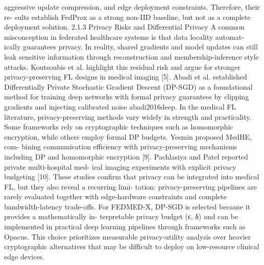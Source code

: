 aggressive update compression, and edge deployment constraints. Therefore, their re- sults establish FedProx as a strong non-IID baseline, but not as a complete deployment solution.
2.1.3
Privacy Risks and Differential Privacy
A common misconception in federated healthcare systems is that data locality automat- ically guarantees privacy. In reality, shared gradients and model updates can still leak sensitive information through reconstruction and membership-inference style attacks.
Koutsoubis et al. highlight this residual risk and argue for stronger privacy-preserving
FL designs in medical imaging [5].
Abadi et al.
established Differentially Private
Stochastic Gradient Descent (DP-SGD) as a foundational method for training deep networks with formal privacy guarantees by clipping gradients and injecting calibrated noise abadi2016deep.
In the medical FL literature, privacy-preserving methods vary widely in strength and practicality. Some frameworks rely on cryptographic techniques such as homomorphic encryption, while others employ formal DP budgets. Yesmin proposed MedHE, com- bining communication efficiency with privacy-preserving mechanisms including DP and homomorphic encryption [9]. Pachlasiya and Patel reported private multi-hospital med- ical imaging experiments with explicit privacy budgeting [10]. These studies confirm that privacy can be integrated into medical FL, but they also reveal a recurring limi- tation: privacy-preserving pipelines are rarely evaluated together with edge-hardware constraints and complete bandwidth-latency trade-offs.
For FEDMED-X, DP-SGD is selected because it provides a mathematically in- terpretable privacy budget (ϵ, δ) and can be implemented in practical deep learning pipelines through frameworks such as Opacus.
This choice prioritizes measurable privacy-utility analysis over heavier cryptographic alternatives that may be difficult to deploy on low-resource clinical edge devices.

